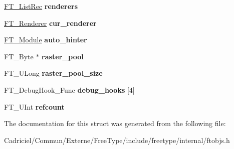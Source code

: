 \begin{DoxyCompactItemize}
\item 
\hyperlink{struct_f_t___list_rec__}{F\+T\+\_\+\+List\+Rec} {\bfseries renderers}\hypertarget{struct_f_t___library_rec___ad9503f71cf4e4d88edfbdda59eb5e43d}{}\label{struct_f_t___library_rec___ad9503f71cf4e4d88edfbdda59eb5e43d}

\item 
\hyperlink{struct_f_t___renderer_rec__}{F\+T\+\_\+\+Renderer} {\bfseries cur\+\_\+renderer}\hypertarget{struct_f_t___library_rec___a528dd3298756070ecad7d0f82f009294}{}\label{struct_f_t___library_rec___a528dd3298756070ecad7d0f82f009294}

\item 
\hyperlink{struct_f_t___module_rec__}{F\+T\+\_\+\+Module} {\bfseries auto\+\_\+hinter}\hypertarget{struct_f_t___library_rec___ae608b33b223905d4d70b782ed7ec8c78}{}\label{struct_f_t___library_rec___ae608b33b223905d4d70b782ed7ec8c78}

\item 
F\+T\+\_\+\+Byte $\ast$ {\bfseries raster\+\_\+pool}\hypertarget{struct_f_t___library_rec___aa8dd799d2efb7817b05c4a02a6828275}{}\label{struct_f_t___library_rec___aa8dd799d2efb7817b05c4a02a6828275}

\item 
F\+T\+\_\+\+U\+Long {\bfseries raster\+\_\+pool\+\_\+size}\hypertarget{struct_f_t___library_rec___a798afdcaf0cda349eb454b769abfa251}{}\label{struct_f_t___library_rec___a798afdcaf0cda349eb454b769abfa251}

\item 
F\+T\+\_\+\+Debug\+Hook\+\_\+\+Func {\bfseries debug\+\_\+hooks} \mbox{[}4\mbox{]}\hypertarget{struct_f_t___library_rec___a1ba1f5abd0254a22dae533a9ac971b84}{}\label{struct_f_t___library_rec___a1ba1f5abd0254a22dae533a9ac971b84}

\item 
F\+T\+\_\+\+U\+Int {\bfseries refcount}\hypertarget{struct_f_t___library_rec___aad71b1ecfaea56594fbd21c18e72f15c}{}\label{struct_f_t___library_rec___aad71b1ecfaea56594fbd21c18e72f15c}

\end{DoxyCompactItemize}


The documentation for this struct was generated from the following file\+:\begin{DoxyCompactItemize}
\item 
Cadriciel/\+Commun/\+Externe/\+Free\+Type/include/freetype/internal/ftobjs.\+h\end{DoxyCompactItemize}
